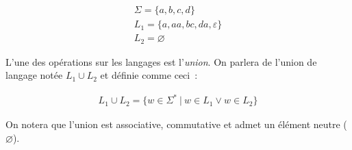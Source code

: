\begin{example}
    \begin{gather*}
        \Sigma = \{a, b, c, d\} \\
        L_1 = \{a, aa, bc, da, \varepsilon\} \\
        L_2 = \varnothing
    \end{gather*}
\end{example}



\begin{definition}
    L'une des opérations sur les langages est l'\textit{union}. On parlera de
    l'union de langage notée \(L_1 \cup L_2\) et définie comme ceci~:

    \begin{gather*}
        L_1 \cup L_2 = \{w \in \Sigma ^ * ~|~ w \in L_1 \lor w \in L_2\}
    \end{gather*}

    \noindent On notera que l'union est associative, commutative et admet un
    élément neutre (\(\varnothing\)).
\end{definition}



